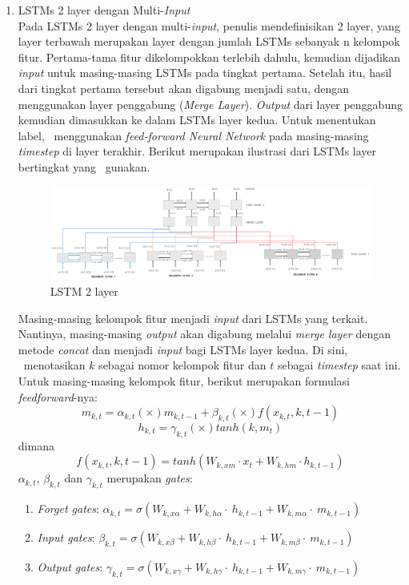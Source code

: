 \begin{enumerate}
	\item LSTMs 2 layer dengan Multi-\textit{Input}\\
	Pada LSTMs 2 layer dengan multi-\textit{input}, penulis mendefinisikan 2 layer, yang layer terbawah merupakan layer dengan jumlah LSTMs sebanyak n kelompok fitur. Pertama-tama fitur dikelompokkan terlebih dahulu, kemudian dijadikan \textit{input} untuk masing-masing LSTMs pada tingkat pertama. Setelah itu, hasil dari tingkat pertama tersebut akan digabung menjadi satu, dengan menggunakan layer penggabung (\textit{Merge Layer}). \textit{Output} dari layer penggabung kemudian dimasukkan ke dalam LSTMs layer kedua. Untuk menentukan label, \saya~menggunakan \textit{feed-forward Neural Network} pada masing-masing \textit{timestep} di layer terakhir. Berikut merupakan ilustrasi dari LSTMs layer bertingkat yang \saya~gunakan.
	
	\begin{figure}
		\centering
		\includegraphics[width=1.0\linewidth]{images/lstm2}
		\caption{LSTM 2 layer}
		\label{fig:lstm2}
	\end{figure}

	Masing-masing kelompok fitur menjadi \textit{input} dari LSTMs yang terkait. Nantinya, masing-masing \textit{output} akan digabung melalui \textit{merge layer} dengan metode \textit{concat} dan menjadi \textit{input} bagi LSTMs layer kedua.
	Di sini, \saya~menotasikan $ k $ sebagai nomor kelompok fitur dan $ t $ sebagai \textit{timestep} saat ini. Untuk masing-masing kelompok fitur, berikut merupakan formulasi \textit{feedforward}-nya:
	\begin{equation}\label{eq:mt2}
	m_{k,t}=\alpha_{k,t} (\times) m_{k,t-1} + \beta_{k,t} (\times) f(x_{k,t},{k,t-1})
	\end{equation}
	\begin{equation}\label{eq:ht2}
	h_{k,t}=\gamma_{k,t} (\times) tanh(k,m_{t})
	\end{equation}
	dimana
	\begin{equation}\label{eq:hf2}
	f(x_{k,t},{k,t-1})=tanh(W_{k,xm} \cdot x_{t} + W_{k,hm} \cdot h_{k,t-1})
	\end{equation}
	$ \alpha_{k,t} $, $ \beta_{k,t} $ dan $ \gamma_{k,t} $ merupakan \textit{gates}:
	\begin{enumerate}
	\item \textit{Forget gates}: $ \alpha_{k,t}=\sigma(W_{k,x\alpha}+W_{k,h\alpha}\cdot~h_{k,t-1}+W_{k,m\alpha}\cdot~m_{k,t-1}) $
	\item \textit{Input gates}: $ \beta_{k,t}=\sigma(W_{k,x\beta}+W_{k,h\beta}\cdot~h_{k,t-1}+W_{k,m\beta}\cdot~m_{k,t-1}) $
	\item \textit{Output gates}: $ \gamma_{k,t}=\sigma(W_{k,x\gamma}+W_{k,h\gamma}\cdot~h_{k,t-1}+W_{k,m\gamma}\cdot~m_{k,t-1}) $
	\end{enumerate}


\end{enumerate}
